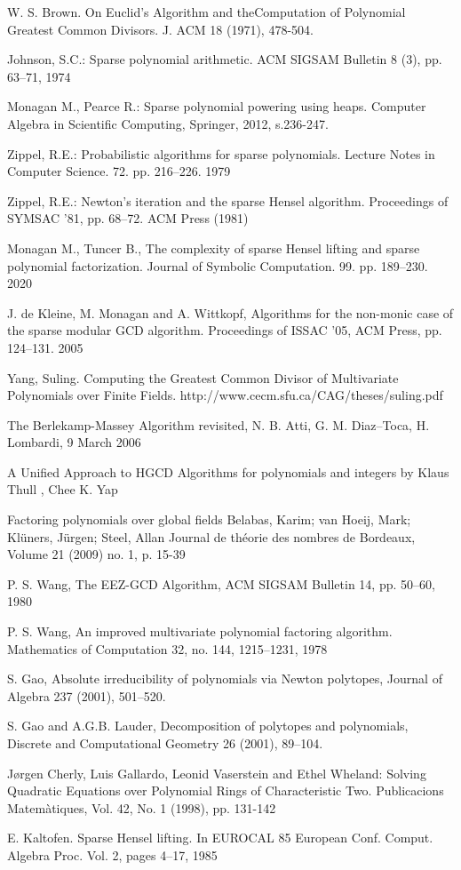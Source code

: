 \documentclass[11pt,reqno]{amsart}
\numberwithin{equation}{section}
\begin{document}
\begin{thebibliography}{99}
 W. S. Brown. On Euclid’s Algorithm and theComputation of 
Polynomial Greatest Common Divisors. J. ACM 18 (1971), 478-504.

 Johnson, S.C.: Sparse polynomial arithmetic. ACM SIGSAM 
Bulletin 8 (3), pp. 63--71, 1974

 Monagan M., Pearce R.: Sparse polynomial powering using heaps. 
Computer Algebra in Scientific Computing, Springer, 2012, s.236-247. 

 Zippel, R.E.: Probabilistic algorithms for sparse polynomials. 
Lecture Notes in Computer Science. 72. pp. 216--226. 1979

 Zippel, R.E.: Newton’s iteration and the sparse Hensel 
algorithm. Proceedings of SYMSAC ’81, pp. 68--72. ACM Press (1981)

 Monagan M., Tuncer B.,
The complexity of sparse Hensel lifting and sparse polynomial factorization. 
Journal of Symbolic Computation. 99. pp. 189--230. 2020

  J. de Kleine, M. Monagan and A. Wittkopf, Algorithms for the 
non-monic case of the sparse modular GCD algorithm. Proceedings of ISSAC ’05, 
ACM Press, pp. 124--131. 2005

 Yang, Suling. Computing the Greatest Common Divisor of 
Multivariate Polynomials over Finite Fields. 
http://www.cecm.sfu.ca/CAG/theses/suling.pdf
	
 The Berlekamp-Massey Algorithm revisited, N. B. Atti, G. M. 
Diaz–Toca, H. Lombardi, 9 March 2006
	
 A Unified Approach to HGCD Algorithms for polynomials and 
integers by Klaus Thull , Chee K. Yap
	
  Factoring polynomials over global fields Belabas, 
Karim; van Hoeij, Mark; Klüners, Jürgen; Steel, Allan Journal de théorie des 
nombres de Bordeaux, Volume 21 (2009) no. 1, p. 15-39

 P. S. Wang, The EEZ-GCD Algorithm, ACM SIGSAM Bulletin 14, pp. 
50--60, 1980

 P. S. Wang, An improved multivariate polynomial factoring 
algorithm. Mathematics of Computation 32, no. 144, 1215--1231, 1978

 S. Gao, Absolute irreducibility of polynomials via Newton 
polytopes, Journal of Algebra
237 (2001), 501--520.

 S. Gao and A.G.B. Lauder, Decomposition of polytopes and 
polynomials, Discrete and Computational Geometry 26 (2001), 89--104.

 Jørgen Cherly, Luis Gallardo, Leonid Vaserstein and 
Ethel Wheland:  Solving Quadratic Equations over Polynomial Rings of 
Characteristic Two. Publicacions Matemàtiques, Vol. 42, No. 1 (1998), pp. 
131-142

 E. Kaltofen.  Sparse Hensel lifting.  In EUROCAL 85 European 
Conf. Comput. Algebra Proc. Vol. 2, pages 4–17, 1985
\end{thebibliography}
\end{document}
